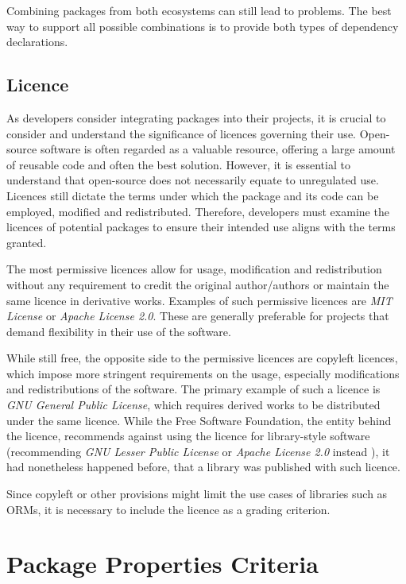 Combining packages from both ecosystems can still lead to problems. The best way
to support all possible combinations is to provide both types of dependency
declarations.

\subsection{Licence}
As developers consider integrating packages into their projects, it is crucial
to consider and understand the significance of licences governing their use.
Open-source software is often regarded as a valuable resource, offering a large
amount of reusable code and often the best solution. However, it is essential to
understand that open-source does not necessarily equate to unregulated use.
Licences still dictate the terms under which the package and its code can be
employed, modified and redistributed. Therefore, developers must examine the
licences of potential packages to ensure their intended use aligns with the
terms granted.

The most permissive licences allow for usage, modification and redistribution
without any requirement to credit the original author/authors or maintain the
same licence in derivative works. Examples of such permissive licences are
\textit{MIT License}\cite{MITLicense} or \textit{Apache License
2.0}\cite{ApacheLicense2}. These are generally preferable for projects that
demand flexibility in their use of the software.

While still free, the opposite side to the permissive licences are copyleft
licences, which impose more stringent requirements on the usage, especially
modifications and redistributions of the software. The primary example of such a
licence is \textit{GNU General Public License}, which requires derived works to
be distributed under the same licence. While the Free Software Foundation, the
entity behind the licence, recommends against using the licence for
library-style software (recommending \textit{GNU Lesser Public License} or
\textit{Apache License 2.0} instead ), it had nonetheless
happened before, that a library was published with such licence.

Since copyleft or other provisions might limit the use cases of libraries such
as ORMs, it is necessary to include the licence as a grading criterion.

\section{Package Properties Criteria}

